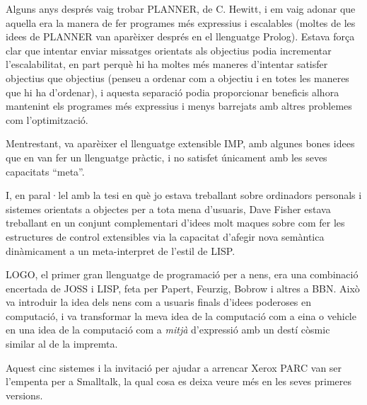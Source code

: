 Alguns anys després vaig trobar PLANNER, de C. Hewitt, i em vaig adonar que aquella era la manera de fer programes més expressius i escalables (moltes de les idees de PLANNER van aparèixer després  en el llenguatge Prolog). Estava força clar que intentar enviar missatges orientats als objectius podia incrementar l'escalabilitat, en part perquè hi ha moltes més maneres d'intentar satisfer objectius que objectius (penseu a ordenar com a objectiu i en totes les maneres que hi ha d'ordenar), i aquesta separació podia proporcionar beneficis alhora mantenint els programes més expressius i menys barrejats amb altres problemes com l'optimització.

Mentrestant,  va aparèixer el llenguatge extensible IMP, amb algunes bones idees que en van fer un llenguatge pràctic, i no satisfet únicament amb les seves capacitats ``meta''.

I, en paral·lel amb la tesi en què jo estava treballant sobre ordinadors personals i sistemes orientats a objectes per a tota mena d'usuaris, Dave Fisher estava treballant en un conjunt complementari d'idees molt maques sobre com fer les estructures de control extensibles via la capacitat d'afegir nova semàntica dinàmicament a un meta-interpret de l'estil de LISP.

LOGO, el primer gran llenguatge de programació per a nens, era una combinació encertada de JOSS i LISP, feta per Papert, Feurzig, Bobrow i altres a BBN. Això va introduir la idea dels nens com a usuaris finals d'idees poderoses en computació, i va transformar la meva idea de la computació com a eina o vehicle en una idea de la computació com a \emph{mitjà} d'expressió amb un destí còsmic similar al de la impremta.

Aquest cinc sistemes i la invitació per ajudar a arrencar Xerox PARC van ser l'empenta per a Smalltalk, la qual cosa es deixa veure més en les seves primeres versions.

